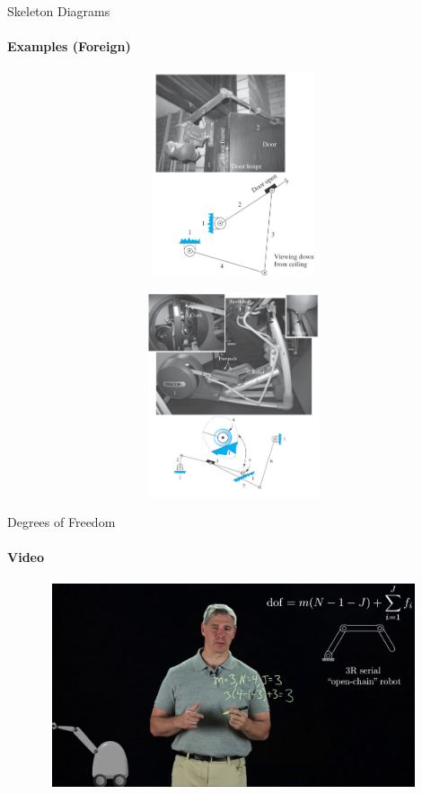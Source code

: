 \documentclass[aspectratio=169]{beamer}
\begin{document}
\begin{frame}[t]{Skeleton Diagrams}
    \framesubtitle{Examples (Foreign)}
    \vspace{-0.5cm}
    \begin{figure}[H]
        \begin{subfigure}{0.49\textwidth}
            \centering\includegraphics[height=6cm,width=1\textwidth,keepaspectratio]{en1_mech.png}
            \label{fig:en1_mech.png}
        \end{subfigure}
        \begin{subfigure}{0.49\textwidth}
            \centering\includegraphics[height=6cm,width=1\textwidth,keepaspectratio]{en2_mech.png}
            \label{fig:en2_mech.png}
        \end{subfigure}
    \end{figure}       
    \end{frame}

\begin{frame}[t]{Degrees of Freedom}
    \framesubtitle{Video}
    \vspace{-0.6cm}
    \begin{figure}[H]
        \href{https://youtu.be/zI64DyaRUvQ}{
            \centering\includegraphics[height=6cm,width=1\textwidth,keepaspectratio]{dof_video.jpg}}
        \label{fig:dof_video.jpg}
    \end{figure}
\end{frame}
\end{document}
